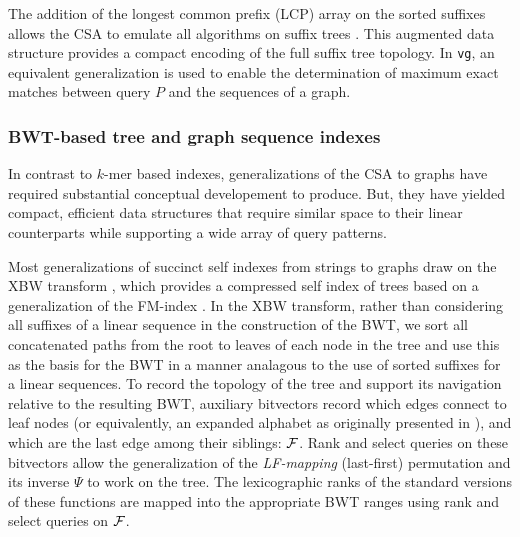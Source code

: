 The addition of the longest common prefix (LCP) array on the sorted suffixes allows the CSA to emulate all algorithms on suffix trees \cite{abouelhoda2004replacing}.
This augmented data structure provides a compact encoding of the full suffix tree topology.
In {\tt vg}, an equivalent generalization is used to enable the determination of maximum exact matches between query $P$ and the sequences of a graph.


\subsubsection{BWT-based tree and graph sequence indexes}

In contrast to $k$-mer based indexes, generalizations of the CSA to graphs have required substantial conceptual developement to produce.
But, they have yielded compact, efficient data structures that require similar space to their linear counterparts while supporting a wide array of query patterns.

Most generalizations of succinct self indexes from strings to graphs draw on the XBW transform \cite{ferragina2005structuring}, which provides a compressed self index of trees based on a generalization of the FM-index \cite{ferragina2009compressing}.
In the XBW transform, rather than considering all suffixes of a linear sequence in the construction of the BWT, we sort all concatenated paths from the root to leaves of each node in the tree and use this as the basis for the BWT in a manner analagous to the use of sorted suffixes for a linear sequences.
To record the topology of the tree and support its navigation relative to the resulting BWT, auxiliary bitvectors record which edges connect to leaf nodes (or equivalently, an expanded alphabet as originally presented in \cite{ferragina2005structuring}), and which are the last edge among their siblings: ${\cal F}$.
Rank and select queries on these bitvectors allow the generalization of the \emph{LF-mapping} (last-first) permutation and its inverse $\Psi$ to work on the tree.
The lexicographic ranks of the standard versions of these functions are mapped into the appropriate BWT ranges using rank and select queries on ${\cal F}$.

